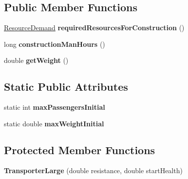 \subsection*{Public Member Functions}
\begin{DoxyCompactItemize}
\item 
\hyperlink{classuniverse_1_1_resource_demand}{Resource\+Demand} {\bfseries required\+Resources\+For\+Construction} ()\hypertarget{classtools_1_1vehicles_1_1sea_1_1_transporter_large_a45ce302d4af78f31aff39d2d99f3be2f}{}\label{classtools_1_1vehicles_1_1sea_1_1_transporter_large_a45ce302d4af78f31aff39d2d99f3be2f}

\item 
long {\bfseries construction\+Man\+Hours} ()\hypertarget{classtools_1_1vehicles_1_1sea_1_1_transporter_large_a6c2014433f2f9e6fd2b2c79c0df07964}{}\label{classtools_1_1vehicles_1_1sea_1_1_transporter_large_a6c2014433f2f9e6fd2b2c79c0df07964}

\item 
double {\bfseries get\+Weight} ()\hypertarget{classtools_1_1vehicles_1_1sea_1_1_transporter_large_ab93d576d56bc4055c2868e4b024f290a}{}\label{classtools_1_1vehicles_1_1sea_1_1_transporter_large_ab93d576d56bc4055c2868e4b024f290a}

\end{DoxyCompactItemize}
\subsection*{Static Public Attributes}
\begin{DoxyCompactItemize}
\item 
static int {\bfseries max\+Passengers\+Initial}\hypertarget{classtools_1_1vehicles_1_1sea_1_1_transporter_large_abaffa555e135d4e54c7ac60764ef9992}{}\label{classtools_1_1vehicles_1_1sea_1_1_transporter_large_abaffa555e135d4e54c7ac60764ef9992}

\item 
static double {\bfseries max\+Weight\+Initial}\hypertarget{classtools_1_1vehicles_1_1sea_1_1_transporter_large_a117958c65c5e6841e48e6fa34e658833}{}\label{classtools_1_1vehicles_1_1sea_1_1_transporter_large_a117958c65c5e6841e48e6fa34e658833}

\end{DoxyCompactItemize}
\subsection*{Protected Member Functions}
\begin{DoxyCompactItemize}
\item 
{\bfseries Transporter\+Large} (double resistance, double start\+Health)\hypertarget{classtools_1_1vehicles_1_1sea_1_1_transporter_large_a9f445254c9ff591022937ff49b12bd17}{}\label{classtools_1_1vehicles_1_1sea_1_1_transporter_large_a9f445254c9ff591022937ff49b12bd17}

\end{DoxyCompactItemize}
